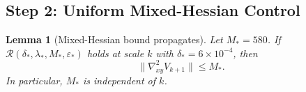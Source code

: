 \documentclass[11pt]{article}
\newtheorem{lemma}[theorem]{Lemma}
\theoremstyle{definition}
\newcommand{\1}{\mathbf{1}}
\begin{document}
\subsection{Step 2: Uniform Mixed-Hessian Control}

\begin{lemma}[Mixed-Hessian bound propagates]\label{lem:step2-mixed-hessian}
Let $M_* = 580$. If $\mathcal{R}(\delta_*, \lambda_*, M_*, \varepsilon_*)$ holds at scale $k$ with 
$\delta_* = 6 \times 10^{-4}$, then
\begin{equation}\label{eq:step2-bound}
\|\nabla^2_{xy} V_{k+1}\| \le M_*.
\end{equation}
In particular, $M_*$ is independent of $k$.
\end{lemma}
\end{document}
